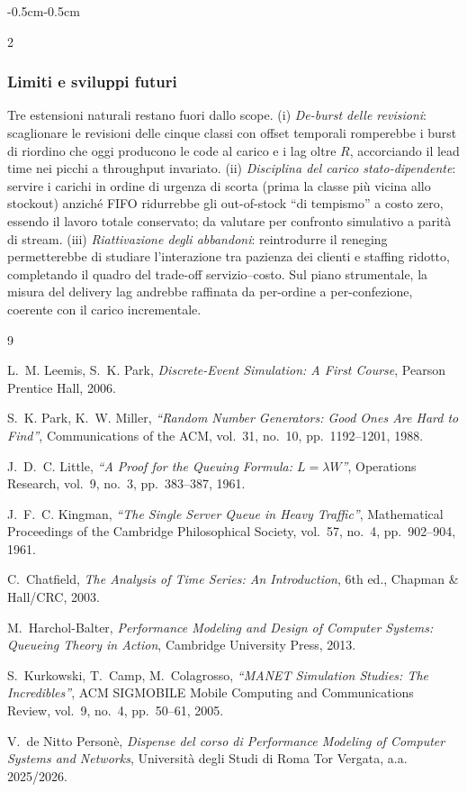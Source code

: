 \documentclass{article}
\begin{document}
\begin{adjustwidth}{-0.5cm}{-0.5cm}
\begin{multicols}{2}
\subsubsection*{Limiti e sviluppi futuri}
Tre estensioni naturali restano fuori dallo scope. (i) \emph{De-burst delle revisioni}: scaglionare
le revisioni delle cinque classi con offset temporali romperebbe i burst di riordino che oggi
producono le code al carico e i lag oltre $R$, accorciando il lead time nei picchi a throughput
invariato. (ii) \emph{Disciplina del carico stato-dipendente}: servire i carichi in ordine di
urgenza di scorta (prima la classe più vicina allo stockout) anziché FIFO ridurrebbe gli
out-of-stock ``di tempismo'' a costo zero, essendo il lavoro totale conservato; da valutare per
confronto simulativo a parità di stream. (iii) \emph{Riattivazione degli abbandoni}: reintrodurre
il reneging permetterebbe di studiare l'interazione tra pazienza dei clienti e staffing ridotto,
completando il quadro del trade-off servizio--costo. Sul piano strumentale, la misura del delivery
lag andrebbe raffinata da per-ordine a per-confezione, coerente con il carico incrementale.
\end{multicols}
\newpage
\begin{thebibliography}{9}

L.~M. Leemis, S.~K. Park, \textit{Discrete-Event Simulation: A First Course}, Pearson Prentice
Hall, 2006.

S.~K. Park, K.~W. Miller, \textit{``Random Number Generators: Good Ones Are Hard to Find''},
Communications of the ACM, vol.~31, no.~10, pp.~1192--1201, 1988.

J.~D.~C. Little, \textit{``A Proof for the Queuing Formula: $L = \lambda W$''}, Operations
Research, vol.~9, no.~3, pp.~383--387, 1961.

J.~F.~C. Kingman, \textit{``The Single Server Queue in Heavy Traffic''}, Mathematical Proceedings
of the Cambridge Philosophical Society, vol.~57, no.~4, pp.~902--904, 1961.

C.~Chatfield, \textit{The Analysis of Time Series: An Introduction}, 6th ed., Chapman \&
Hall/CRC, 2003.

M.~Harchol-Balter, \textit{Performance Modeling and Design of Computer Systems: Queueing Theory in
Action}, Cambridge University Press, 2013.

S.~Kurkowski, T.~Camp, M.~Colagrosso, \textit{``MANET Simulation Studies: The Incredibles''}, ACM
SIGMOBILE Mobile Computing and Communications Review, vol.~9, no.~4, pp.~50--61, 2005.

V.~de Nitto Personè, \textit{Dispense del corso di Performance Modeling of Computer Systems and
Networks}, Università degli Studi di Roma Tor Vergata, a.a. 2025/2026.

\end{thebibliography}

\end{adjustwidth}
\end{document}
